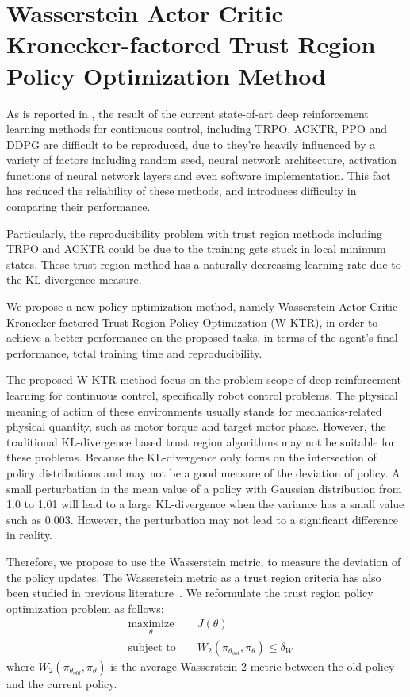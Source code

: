 \section{Wasserstein Actor Critic Kronecker-factored Trust Region Policy Optimization Method }
As is reported in \cite{henderson2017matters}, the result of the current state-of-art deep reinforcement learning methods for continuous control, including TRPO, ACKTR, PPO and DDPG are difficult to be reproduced, due to they're heavily influenced by a variety of factors including random seed, neural network architecture, activation functions of neural network layers and even software implementation. This fact has reduced the reliability of these methods, and introduces difficulty in comparing their performance.

Particularly, the reproducibility problem with trust region methods including TRPO and ACKTR could be due to the training gets stuck in local minimum states. These trust region method has a naturally decreasing learning rate due to the KL-divergence measure. 

We propose a new policy optimization method, namely Wasserstein Actor Critic Kronecker-factored Trust Region Policy Optimization (W-KTR), in order to achieve a better performance on the proposed tasks, in terms of the agent's final performance, total training time and reproducibility.

The proposed W-KTR method focus on the problem scope of deep reinforcement learning for continuous control, specifically robot control problems. The physical meaning of action of these environments usually stands for mechanics-related physical quantity, such as motor torque and target motor phase. However, the traditional KL-divergence based trust region algorithms may not be suitable for these problems. Because the KL-divergence only focus on the intersection of policy distributions and may not be a good measure of the deviation of policy. A small perturbation in the mean value of a policy with Gaussian distribution from 1.0 to 1.01 will lead to a large KL-divergence when the variance has a small value such as 0.003. However, the perturbation may not lead to a significant difference in reality.

Therefore, we propose to use the Wasserstein metric, to measure the deviation of the policy updates. The Wasserstein metric as a trust region criteria has also been studied in previous literature~\cite{tolstikhin2017wasserstein}. We reformulate the trust region policy optimization problem as follows:
\begin{equation}
    \begin{aligned}
&    \underset{\theta}{\text{maximize}} 
&& J(\theta) \\
& \text{subject to } 
&& \overline{W_2}(\pi_{\theta_{old}},\pi_\theta) \leq \delta_{W}\end{aligned}
\end{equation}
where $ \overline{W_2}(\pi_{\theta_{old}},\pi_\theta)$ is the average Wasserstein-2 metric between the old policy and the current policy.

